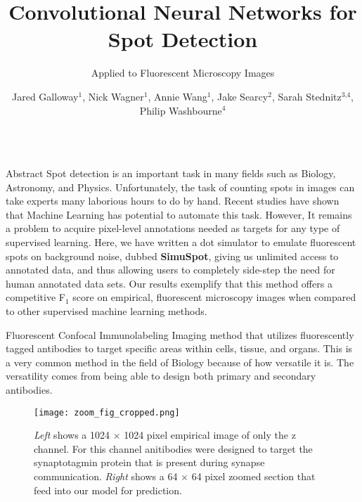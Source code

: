 \documentclass[final]{beamer}
\title{Convolutional Neural Networks for Spot Detection} %
\subtitle{Applied to Fluorescent Microscopy Images} %
\author{Jared Galloway$^1$, Nick Wagner$^1$, Annie Wang$^1$, Jake Searcy$^2$, Sarah Stednitz$^{3\text{,}4}$, Philip Washbourne$^4$} %
\institute{1.BGMP, University of Oregon 2.RACS, University of Oregon 3.Max Planck Institute for Biological Cybernetics 4.Institute of Neuroscience, University of Oregon}
\newlength{\sepwid}
\newlength{\onecolwid}
\begin{document}

\setlength{\belowcaptionskip}{2ex} %
\setlength\belowdisplayshortskip{2ex} %

\begin{frame}[t] %

\begin{columns}[t] %


\begin{column}{\onecolwid}
\begin{block}{Abstract}
\vspace{.2in}
Spot detection is an important task in many fields such as Biology, Astronomy, and Physics. Unfortunately, the task of counting spots in images can take experts many laborious hours to do by hand. Recent studies have shown that Machine Learning has potential to automate this task. However, It remains a problem to acquire pixel-level annotations needed as targets for any type of supervised learning.  Here, we have written a dot simulator to emulate fluorescent spots on background noise, dubbed \textbf{SimuSpot}, giving us unlimited access to annotated data, and thus allowing users to completely side-step the need for human annotated data sets. Our results exemplify that this method offers a competitive F$_1$ score on empirical, fluorescent microscopy images when compared to other supervised machine learning methods.

\vspace{.4in}

\begin{alertblock}{Fluorescent Confocal Immunolabeling}
Imaging method that utilizes fluorescently tagged antibodies to target specific areas within cells, tissue, and organs. This is a very common method in the field of Biology because of how versatile it is. The versatility comes from being able to design both primary and secondary antibodies.
\end{alertblock}
    \begin{figure}
        \texttt{[image: zoom\_fig\_cropped.png]}
        \setlength{\belowcaptionskip}{-20pt}
        \caption{\textit{Left} shows a 1024 $\times$ 1024 pixel empirical image of only the z channel. For this channel anitibodies were designed to target the synaptotagmin protein that is present during synapse communication. \textit{Right} shows a 64 $\times$ 64 pixel zoomed section that feed into our model for prediction.}
    \end{figure}
\end{block}


\end{column}
\end{columns}
\end{frame}
\end{document}
